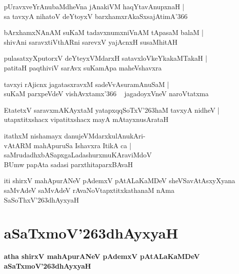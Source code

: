 \documentclass[twoside,12pt,openright]{book}
\def\S{\char'263}
\newcounter{shloka}[chapter]
\begin{document}
\begin{shloka}%
pUravxveYrAnubaMdheVna jAnakiVM haqYtavAnupxnaH |\\
sa tavxyA nihatoV deYtoyxV barxhamxrAkaSxsajAtimA\char'366 
\end{shloka}

\begin{shloka}%
bArxhamxNAnAM suKaM tadavxnumxniVnAM tApasaM balaM |\\
shivAni saravxtiVthARni sarevxV yajAcnxH susaMhitAH 
\end{shloka}

\begin{shloka}%
pulasatxyXputorxV deYteyxVMdarxH satavxloVkeYkakaMTakaH |\\
patitaH paqthiviV sarAvx suKamApa maheVshavxra
\end{shloka}

\begin{shloka}%
tavxyi rAjicnx jagatasxravxM sadeVvAsuramAnuSaM |\\
suKaM parxpeVdeV vishAvxtamx\char'366 ~ jagadoyxVneV naroVtatxma
\end{shloka}

\begin{shloka}%
EtatetxV saravxmAKAyxtaM yatapxqqSoTxV\S haM tavxyA nidheV |\\
utapxtitxshacx vipatitxshacx mayA mAtayxnusArataH 
\end{shloka}

\begin{shloka}%
itathxM  nishamayx danujeVMdarxkulAnukAri-\\
vAtARM mahApuruSa Ishavxra ItikA ca |\\
saMrudadhxbASapxgaLadashurxmuKAraviMdoV \\
BUmw papAta sadasi parxthitaparxBAvaH 
\end{shloka}


\begin{center}
iti shirxV mahApurANeV pAdemxV pAtALaKaMDeV sheVSavAtAsxyXyana saMvAdeV 
saMvAdeV rAvaNoVtapxtitxkathanaM nAma SaSoThxV\S dhAyxyaH
\end{center}

\chapter{aSaTxmoV\S dhAyxyaH}

\begin{center}
{\LARGE\bfseries atha shirxV mahApurANeV pAdemxV pAtALaKaMDeV aSaTxmoV\S dhAyxyaH}
\end{center}
\end{document}
